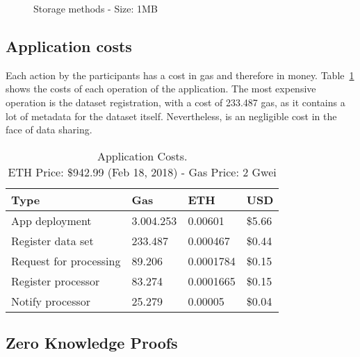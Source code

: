 \begin{figure}[!ht]
  \centering
  \caption{Storage methods - Size: 1MB}
  \label{fig:storage:charts:1mb}
\end{figure}

\subsection{Application costs}
\label{evaluation:app_costs}

Each action by the participants has a cost in gas and therefore in money. Table~\ref{table:app_costs} shows the costs of each operation of the application. The most expensive operation is the dataset registration, with a cost of 233.487 gas, as it contains a lot of metadata for the dataset itself. Nevertheless, is an negligible cost in the face of data sharing.

\begin{table}[!htb]
\centering
\begin{tabular}{|l|l|l|l|}
\hline
 Type & Gas & ETH & USD \\ \hline
 App deployment & 3.004.253 & 0.00601 & \$5.66 \\ \hline
 Register data set & 233.487 & 0.000467 & \$0.44 \\ \hline
 Request for processing & 89.206 & 0.0001784 & \$0.15 \\ \hline
 Register processor & 83.274 & 0.0001665 & \$0.15 \\ \hline
 Notify processor & 25.279 & 0.00005 & \$0.04 \\ \hline
\end{tabular}
\captionsetup{format=hang, justification=centering}
\caption{Application Costs.\\ ETH Price: \$942.99 (Feb 18, 2018) - Gas Price: 2 Gwei}
\label{table:app_costs}
\end{table}

\subsection{Zero Knowledge Proofs}
\label{evaluation:zkp}

